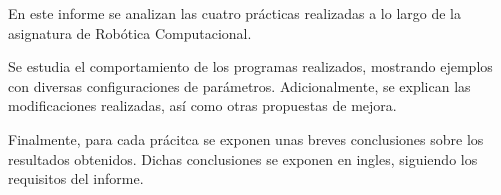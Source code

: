
En este informe se analizan las cuatro prácticas realizadas a lo largo de la asignatura de Robótica Computacional. 

\bigskip Se estudia el comportamiento de los programas realizados, mostrando ejemplos con diversas configuraciones de parámetros. Adicionalmente, se explican las modificaciones realizadas, así como otras propuestas de mejora. 

\bigskip Finalmente, para cada prácitca se exponen unas breves conclusiones sobre los resultados obtenidos. Dichas conclusiones se exponen en ingles, siguiendo los requisitos del informe.
